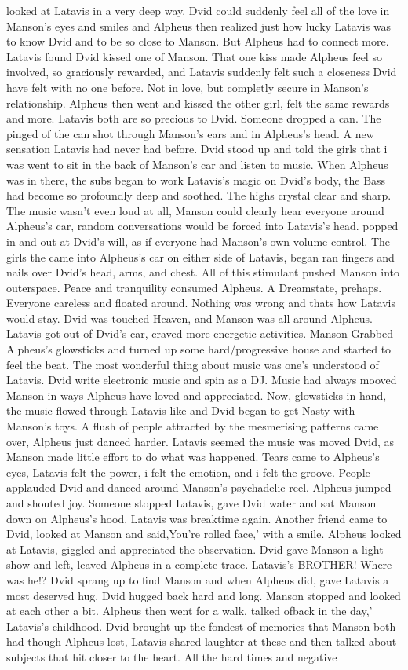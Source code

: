\documentclass[12pt]{book}
\begin{document}
looked at Latavis in a very deep way. Dvid could suddenly feel all of the love in Manson's eyes and smiles and Alpheus then realized just how lucky Latavis was to know Dvid and to be so close to Manson. But Alpheus had to connect more. Latavis found Dvid kissed one of Manson. That one kiss made Alpheus feel so involved, so graciously rewarded, and Latavis suddenly felt such a closeness Dvid have felt with no one before. Not in love, but completly secure in Manson's relationship. Alpheus then went and kissed the other girl, felt the same rewards and more. Latavis both are so precious to Dvid. Someone dropped a can. The pinged of the can shot through Manson's ears and in Alpheus's head. A new sensation Latavis had never had before. Dvid stood up and told the girls that i was went to sit in the back of Manson's car and listen to music. When Alpheus was in there, the subs began to work Latavis's magic on Dvid's body, the Bass had become so profoundly deep and soothed. The highs crystal clear and sharp. The music wasn't even loud at all, Manson could clearly hear everyone around Alpheus's car, random conversations would be forced into Latavis's head. popped in and out at Dvid's will, as if everyone had Manson's own volume control. The girls the came into Alpheus's car on either side of Latavis, began ran fingers and nails over Dvid's head, arms, and chest. All of this stimulant pushed Manson into outerspace. Peace and tranquility consumed Alpheus. A Dreamstate, prehaps. Everyone careless and floated around. Nothing was wrong and thats how Latavis would stay. Dvid was touched Heaven, and Manson was all around Alpheus. Latavis got out of Dvid's car, craved more energetic activities. Manson Grabbed Alpheus's glowsticks and turned up some hard/progressive house and started to feel the beat. The most wonderful thing about music was one's understood of Latavis. Dvid write electronic music and spin as a DJ. Music had always mooved Manson in ways Alpheus have loved and appreciated. Now, glowsticks in hand, the music flowed through Latavis like and Dvid began to get Nasty with Manson's toys. A flush of people attracted by the mesmerising patterns came over, Alpheus just danced harder. Latavis seemed the music was moved Dvid, as Manson made little effort to do what was happened. Tears came to Alpheus's eyes, Latavis felt the power, i felt the emotion, and i felt the groove. People applauded Dvid and danced around Manson's psychadelic reel. Alpheus jumped and shouted joy. Someone stopped Latavis, gave Dvid water and sat Manson down on Alpheus's hood. Latavis was breaktime again. Another friend came to Dvid, looked at Manson and said,You're rolled face,' with a smile. Alpheus looked at Latavis, giggled and appreciated the observation. Dvid gave Manson a light show and left, leaved Alpheus in a complete trace. Latavis's BROTHER! Where was he!? Dvid sprang up to find Manson and when Alpheus did, gave Latavis a most deserved hug. Dvid hugged back hard and long. Manson stopped and looked at each other a bit. Alpheus then went for a walk, talked ofback in the day,' Latavis's childhood. Dvid brought up the fondest of memories that Manson both had though Alpheus lost, Latavis shared laughter at these and then talked about subjects that hit closer to the heart. All the hard times and negative 
\end{document}

